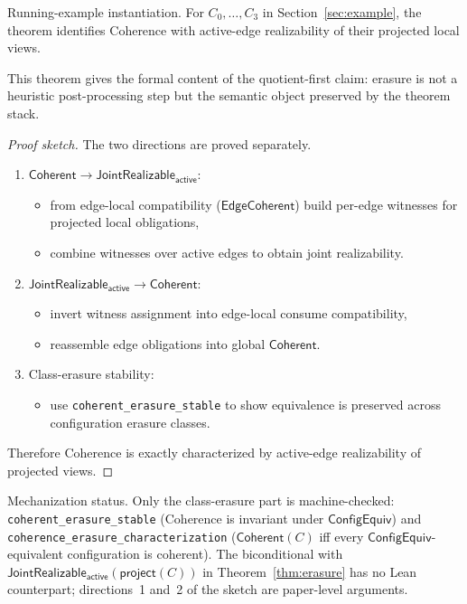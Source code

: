 \documentclass[a4paper,10pt,twocolumn,english]{article}
\numberwithin{equation}{section}
\theoremstyle{paperdef}
\theoremstyle{paperplain}
\theoremstyle{paperdef}
\theoremstyle{paperremark}
\theoremstyle{paperdef}
\newcommand{\Coherent}{\ensuremath{\mathsf{Coherent}}}
\newcommand{\ConfigEquiv}{\ensuremath{\mathsf{ConfigEquiv}}}
\newcommand{\JointActive}[1]{\ensuremath{\mathsf{JointRealizable}_{\mathsf{active}}(#1)}}
\begin{document}
Running-example instantiation. For $C_0,\dots,C_3$ in
Section~\ref{sec:example}, the theorem identifies Coherence with active-edge
realizability of their projected local views.

This theorem gives the formal content of the quotient-first claim: erasure is not a heuristic post-processing step but the semantic object preserved by the theorem stack.

\begin{proof}[Proof sketch]
	The two directions are proved separately.

	\begin{enumerate}
		\item $\Coherent \to \mathsf{JointRealizable}_{\mathsf{active}}$:
		      \begin{itemize}
			      \item from edge-local compatibility ($\mathsf{EdgeCoherent}$) build per-edge witnesses for projected local obligations,
			      \item combine witnesses over active edges to obtain joint realizability.
		      \end{itemize}
		\item $\mathsf{JointRealizable}_{\mathsf{active}} \to \Coherent$:
		      \begin{itemize}
			      \item invert witness assignment into edge-local consume compatibility,
			      \item reassemble edge obligations into global $\Coherent$.
		      \end{itemize}
		\item Class-erasure stability:
		      \begin{itemize}
			      \item use \nolinkurl{coherent_erasure_stable} to show equivalence is preserved across configuration erasure classes.
		      \end{itemize}
	\end{enumerate}

	Therefore Coherence is exactly characterized by active-edge realizability of projected views.
\end{proof}

Mechanization status. Only the class-erasure part is machine-checked:
\nolinkurl{coherent_erasure_stable} (Coherence is invariant under \ConfigEquiv) and
\nolinkurl{coherence_erasure_characterization} ($\Coherent(C)$ iff every
\ConfigEquiv-equivalent configuration is coherent). The biconditional with
$\JointActive{\mathsf{project}(C)}$ in Theorem~\ref{thm:erasure} has no Lean
counterpart; directions~1 and~2 of the sketch are paper-level arguments.
\end{document}
